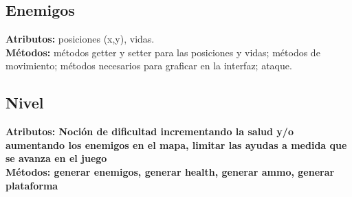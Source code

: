 \documentclass{article}
\begin{document}
\subsection{Enemigos}
\noindent\textbf{Atributos:} posiciones (x,y), vidas.\\
\textbf{Métodos:} métodos getter y setter para las posiciones y vidas; métodos de movimiento; métodos necesarios para graficar en la interfaz; ataque.

\subsection{Nivel}
\noindent\textbf{Atributos: Noción de dificultad incrementando la salud y/o aumentando los enemigos en el mapa, limitar las ayudas a medida que se avanza en el juego}\\
\textbf{Métodos: generar enemigos, generar health, generar ammo, generar plataforma}
\end{document}
